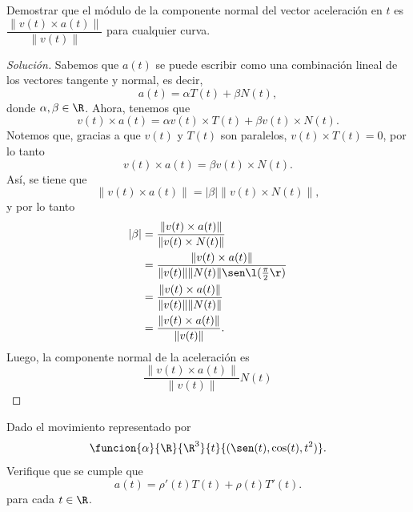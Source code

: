 \documentclass[a4,11pt]{aleph-notas}
\begin{document}
\begin{ejer}
Demostrar que el módulo de la componente normal del vector aceleración en $t$ es $\dfrac{\|v(t) \times a(t)\|}{\|v(t)\|}$ para cualquier curva.
\end{ejer}

\begin{proof}[Solución]
Sabemos que $a(t)$ se puede escribir como una combinación lineal de los vectores tangente y normal, es decir,
    \[
        a(t)=\alpha T(t)+\beta N(t),
    \]
    donde $\alpha,\beta\in\R$.
    Ahora, tenemos que
    \[
        v(t)\times a(t)=\alpha v(t)\times T(t)+\beta v(t)\times N(t).
    \]
    Notemos que, gracias a que $v(t)$ y $T(t)$ son paralelos, $v(t)\times T(t)=0$, por lo tanto
    \[
        v(t)\times a(t)=\beta v(t)\times N(t).
    \]
    Así, se tiene que
    \[
         \| v(t)\times a(t) \| = |\beta| \| v(t)\times N(t) \|,
    \]
    y por lo tanto
    \begin{align*}
        |\beta| 
            & = \frac{\| v(t)\times a(t) \|}{\| v(t)\times N(t) \|} \\
            & = \frac{\| v(t)\times a(t) \|}{\| v(t) \| \| N(t) \| \sen\l(\frac{\pi}{2}\r)} \\
            & = \frac{\| v(t)\times a(t) \|}{\| v(t) \| \| N(t) \|}\\
            & = \frac{\| v(t)\times a(t) \|}{\| v(t) \|}.
    \end{align*}
    Luego, la componente normal de la aceleración es
    \[
        \frac{\| v(t)\times a(t) \|}{\| v(t) \|} N(t)
    \]
\end{proof}

\begin{ejer}
Dado el movimiento representado por 
	\[
		\funcion{\alpha}{\R}{\R^3}{t}{(\sen(t),\cos(t),t^2)}.
	\]
	Verifique que se cumple que
	\[
        a(t)=\rho'(t) T(t)+\rho(t) T' (t).
	\]
	para cada $t\in\R$.
\end{ejer}
\end{document}
